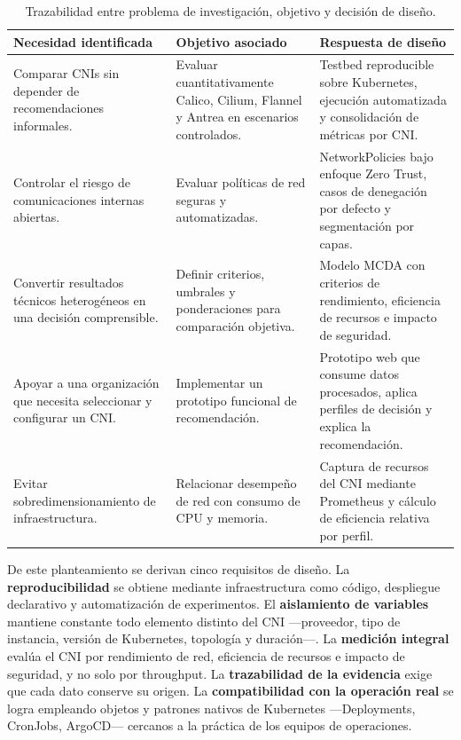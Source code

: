\begin{table}[htbp]
\centering
\scriptsize
\caption{Trazabilidad entre problema de investigación, objetivo y decisión de diseño.}
\label{tab:trazabilidad-diseno}
\begin{tabularx}{\textwidth}{|Y|Y|Y|}
\hline
\textbf{Necesidad identificada} & \textbf{Objetivo asociado} & \textbf{Respuesta de diseño} \\
\hline
Comparar CNIs sin depender de recomendaciones informales. & Evaluar cuantitativamente Calico, Cilium, Flannel y Antrea en escenarios controlados. & Testbed reproducible sobre Kubernetes, ejecución automatizada y consolidación de métricas por CNI. \\
\hline
Controlar el riesgo de comunicaciones internas abiertas. & Evaluar políticas de red seguras y automatizadas. & NetworkPolicies bajo enfoque Zero Trust, casos de denegación por defecto y segmentación por capas. \\
\hline
Convertir resultados técnicos heterogéneos en una decisión comprensible. & Definir criterios, umbrales y ponderaciones para comparación objetiva. & Modelo MCDA con criterios de rendimiento, eficiencia de recursos e impacto de seguridad. \\
\hline
Apoyar a una organización que necesita seleccionar y configurar un CNI. & Implementar un prototipo funcional de recomendación. & Prototipo web que consume datos procesados, aplica perfiles de decisión y explica la recomendación. \\
\hline
Evitar sobredimensionamiento de infraestructura. & Relacionar desempeño de red con consumo de CPU y memoria. & Captura de recursos del CNI mediante Prometheus y cálculo de eficiencia relativa por perfil. \\
\hline
\end{tabularx}
\end{table}

De este planteamiento se derivan cinco requisitos de diseño. La \textbf{reproducibilidad} se obtiene mediante infraestructura como código, despliegue declarativo y automatización de experimentos. El \textbf{aislamiento de variables} mantiene constante todo elemento distinto del CNI ---proveedor, tipo de instancia, versión de Kubernetes, topología y duración---. La \textbf{medición integral} evalúa el CNI por rendimiento de red, eficiencia de recursos e impacto de seguridad, y no solo por throughput. La \textbf{trazabilidad de la evidencia} exige que cada dato conserve su origen. La \textbf{compatibilidad con la operación real} se logra empleando objetos y patrones nativos de Kubernetes ---Deployments, CronJobs, ArgoCD--- cercanos a la práctica de los equipos de operaciones.

